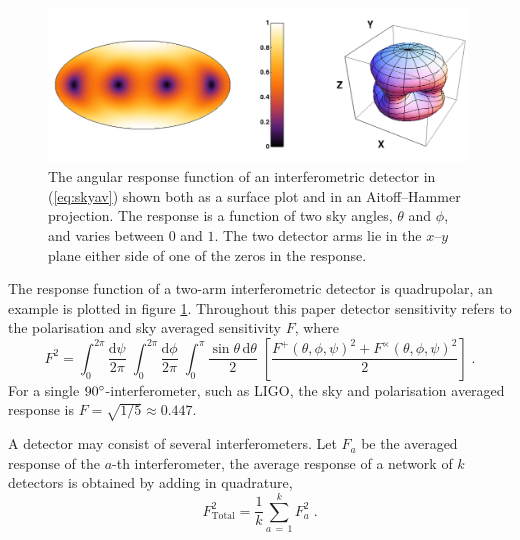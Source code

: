 \begin{figure}
 \centering
 \includegraphics[trim=0cm 0cm 0cm 0cm, width=0.99\textwidth]{LIGO_detectorframe.pdf}
 \caption{The angular response function of an interferometric detector in (\ref{eq:skyav}) shown both as a surface plot and in an Aitoff--Hammer projection. The response is a function of two sky angles, $\theta$ and $\phi$, and varies between $0$ and $1$. The two detector arms lie in the $x$--$y$ plane either side of one of the zeros in the response.}
 \label{fig:LIGO}
\end{figure}

The response function of a two-arm interferometric detector is quadrupolar, an example is plotted in figure \ref{fig:LIGO}. Throughout this paper detector sensitivity refers to the polarisation and sky averaged sensitivity $F$, where
\begin{equation}\label{eq:skyav}
F^{2}=\int_{0}^{2\pi}\frac{\mathrm{d}\psi}{2\pi}\; \int_{0}^{2\pi} \frac{\mathrm{d}\phi}{2\pi}\; \int_{0}^{\pi}\frac{\sin\theta\,\mathrm{d}\theta}{2}\;\left[\frac{F^{+}\left(\theta,\phi,\psi\right)^{2}+F^{\times}\left(\theta,\phi,\psi\right)^{2}}{2}\right]\; .
\end{equation}
For a single $90^\circ$-interferometer, such as LIGO, the sky and polarisation averaged response is $F=\sqrt{1/5}\approx 0.447$.

A detector may consist of several interferometers. Let $F_{a}$ be the averaged response of the $a$-th interferometer, the average response of a network of $k$ detectors is obtained by adding in quadrature,
\begin{equation} F_{\mathrm{Total}}^{2}=\frac{1}{k}\sum_{a\,=\,1}^{k}F_{a}^{2} \; .\end{equation}

